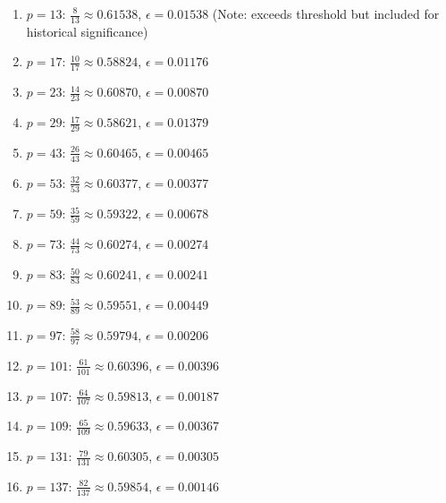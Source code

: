 \documentclass[12pt,a4paper]{report}
\begin{document}
\begin{enumerate}
\item \textbf{$p = 13$}: $\frac{8}{13} \approx 0.61538$, $\epsilon = 0.01538$ (Note: exceeds threshold but included for historical significance)

\item \textbf{$p = 17$}: $\frac{10}{17} \approx 0.58824$, $\epsilon = 0.01176$

\item \textbf{$p = 23$}: $\frac{14}{23} \approx 0.60870$, $\epsilon = 0.00870$

\item \textbf{$p = 29$}: $\frac{17}{29} \approx 0.58621$, $\epsilon = 0.01379$

\item \textbf{$p = 43$}: $\frac{26}{43} \approx 0.60465$, $\epsilon = 0.00465$

\item \textbf{$p = 53$}: $\frac{32}{53} \approx 0.60377$, $\epsilon = 0.00377$

\item \textbf{$p = 59$}: $\frac{35}{59} \approx 0.59322$, $\epsilon = 0.00678$

\item \textbf{$p = 73$}: $\frac{44}{73} \approx 0.60274$, $\epsilon = 0.00274$

\item \textbf{$p = 83$}: $\frac{50}{83} \approx 0.60241$, $\epsilon = 0.00241$

\item \textbf{$p = 89$}: $\frac{53}{89} \approx 0.59551$, $\epsilon = 0.00449$

\item \textbf{$p = 97$}: $\frac{58}{97} \approx 0.59794$, $\epsilon = 0.00206$

\item \textbf{$p = 101$}: $\frac{61}{101} \approx 0.60396$, $\epsilon = 0.00396$

\item \textbf{$p = 107$}: $\frac{64}{107} \approx 0.59813$, $\epsilon = 0.00187$

\item \textbf{$p = 109$}: $\frac{65}{109} \approx 0.59633$, $\epsilon = 0.00367$

\item \textbf{$p = 131$}: $\frac{79}{131} \approx 0.60305$, $\epsilon = 0.00305$

\item \textbf{$p = 137$}: $\frac{82}{137} \approx 0.59854$, $\epsilon = 0.00146$


\end{enumerate}
\end{document}
